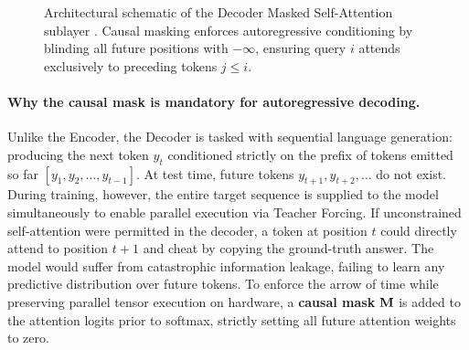 \documentclass[../../main.tex]{subfiles}
\begin{document}
\begin{figure}[htbp]
\caption{Architectural schematic of the Decoder Masked Self-Attention sublayer \cite{vaswani2017}. Causal masking enforces autoregressive conditioning by blinding all future positions with $-\infty$, ensuring query $i$ attends exclusively to preceding tokens $j \le i$.}
\label{fig:vaswani_highlight_masked_mha}
\end{figure}

\paragraph{Why the causal mask is mandatory for autoregressive decoding.}
Unlike the Encoder, the Decoder is tasked with sequential language generation: producing the next token $y_t$ conditioned strictly on the prefix of tokens emitted so far $[y_1, y_2, \dots, y_{t-1}]$. At test time, future tokens $y_{t+1}, y_{t+2}, \dots$ do not exist.
During training, however, the entire target sequence is supplied to the model simultaneously to enable parallel execution via Teacher Forcing. If unconstrained self-attention were permitted in the decoder, a token at position $t$ could directly attend to position $t+1$ and cheat by copying the ground-truth answer. The model would suffer from catastrophic information leakage, failing to learn any predictive distribution over future tokens.
To enforce the arrow of time while preserving parallel tensor execution on hardware, a \textbf{causal mask} $\mathbf{M}$ is added to the attention logits prior to softmax, strictly setting all future attention weights to zero.
\end{document}
